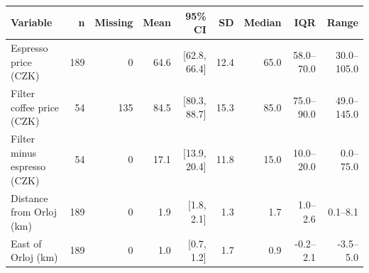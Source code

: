 \begin{tabular}{lrrrrrrrr}
\toprule
Variable & n & Missing & Mean & 95\% CI & SD & Median & IQR & Range \\
\midrule
Espresso price (CZK) & 189 &   0 & 64.6 & [62.8, 66.4] & 12.4 & 65.0 & 58.0--70.0 & 30.0--105.0 \\
Filter coffee price (CZK) &  54 & 135 & 84.5 & [80.3, 88.7] & 15.3 & 85.0 & 75.0--90.0 & 49.0--145.0 \\
Filter minus espresso (CZK) &  54 &   0 & 17.1 & [13.9, 20.4] & 11.8 & 15.0 & 10.0--20.0 & 0.0--75.0 \\
Distance from Orloj (km) & 189 &   0 & 1.9 & [1.8, 2.1] & 1.3 & 1.7 & 1.0--2.6 & 0.1--8.1 \\
East of Orloj (km) & 189 &   0 & 1.0 & [0.7, 1.2] & 1.7 & 0.9 & -0.2--2.1 & -3.5--5.0 \\
\bottomrule
\end{tabular}
